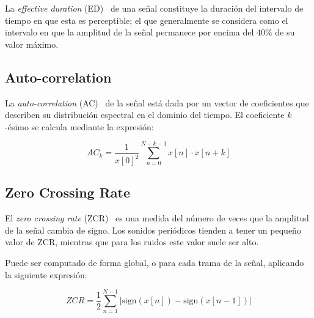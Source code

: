 La \textit{effective duration} (ED)~\cite{Peters04} de una señal constituye la duración del intervalo de tiempo en que esta es perceptible;
el que generalmente se considera como el intervalo en que la amplitud de la señal permanece por encima del 40\% de su valor máximo.

\subsection{Auto-correlation}\label{subsec:auto-correlation}

La \textit{auto-correlation} (AC)~\cite{Gunasekaran11,Peters04} de la señal está dada por un vector de coeficientes que describen su distribución espectral en el dominio del tiempo.
El coeficiente $k$-ésimo se calcula mediante la expresión:

\begin{equation}
    \label{eq:AC}
    AC_k = \frac{1}{x[0]^2}\sum_{n=0}^{N-k-1}{x[n]\cdot x[n+k]}
\end{equation}

\subsection{Zero Crossing Rate}\label{subsec:zeroCrossingRate}

El \textit{zero crossing rate} (ZCR)~\cite{Fagerlund07,Gunasekaran11,Peters04} es una medida del número de veces que la amplitud de la señal cambia de signo.
Los sonidos periódicos tienden a tener un pequeño valor de ZCR, mientras que para los ruidos este valor suele ser alto.

Puede ser computado de forma global, o para cada trama de la señal, aplicando la siguiente expresión:

\begin{equation}
    \label{eq:ZCR}
    ZCR = \frac{1}{2}\sum_{n=1}^{N-1}{|\text{sign}(x[n]) - \text{sign}(x[n-1])|}
\end{equation}
